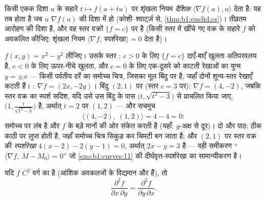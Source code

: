 \begin{remark}[प्रवणता को पढ़ना]
किसी एकक दिशा $u$ के सहारे $t \mapsto f(a + tu)$ पर शृंखला नियम
\emph{दैशिक } $\langle \nabla f(a), u\rangle$ देता है: यह तब 
होता है जब $u$ $\nabla f(a)$ की दिशा में हो (कोशी--श्वार्ट्ज़ से,
\cref{thm:b1:euclid:cs})।  तीव्रतम आरोहण की दिशा है, और वह स्तर
वक्रों $\{f = c\}$ पर  है (किसी स्तर  में खींचे गए वक्र के
सहारे $f$ को अवकलित कीजिए: शृंखला नियम $\langle\nabla f,\,
\text{स्पर्शरेखा}\rangle = 0$ देता है)।
\end{remark}

\begin{example}
\label{ex:b1:multivar:levelcurves}
$f(x, y) = x^2 - y^2$ लीजिए। उसके स्तर : $c > 0$ के लिए $\{f = c\}$
दाएँ-बाएँ खुलता अतिपरवलय है, $c < 0$ के लिए ऊपर-नीचे खुलता, और $c = 0$ के
लिए एक-दूसरे को काटती रेखाओं का युग्म $y = \pm x$ --- किसी पर्वतीय दर्रे का
समोच्च चित्र, जिसका  मूल बिंदु पर है, जहाँ दोनों शून्य-स्तर
रेखाएँ कटती हैं। : $\nabla f = (2x, -2y)$। बिंदु $(2, 1)$ पर (स्तर
$c = 3$ पर): $\nabla f = (4, -2)$, जबकि स्तर वक्र का स्पर्श सदिश, यदि उसे
उस बिंदु के पास $\bigl(t, \sqrt{t^2 - 3}\bigr)$ से प्राचलित किया जाए,
$\bigl(1, \frac{t}{\sqrt{t^2 - 3}}\bigr)$ है, अर्थात् $t = 2$ पर $(1, 2)$
--- और सचमुच
\[
\langle (4, -2),\ (1, 2)\rangle = 4 - 4 = 0 :
\]
 समोच्च पर लंब है और $f$ के बड़े मानों की ओर संकेत करती है (यहाँ:
$y$-अक्ष से दूर)। दो और पाठ:  ठीक काठी पर लुप्त होती है, जहाँ
समोच्च चित्र सिकुड़ कर चिमटी बन जाता है; और $(2,1)$ पर स्तर वक्र की
\emph{स्पर्शरेखा} $4(x - 2) - 2(y - 1) = 0$, अर्थात् $2x - y = 3$ है ---
वही समीकरण ``$\langle \nabla f,\ M - M_0\rangle = 0$'' जो
\cref{exo:b1:curves:11} की दीर्घवृत्त-स्पर्शरेखा का सामान्यीकरण है।
\end{example}

\begin{theorem}[श्वार्ट्ज़]\label{thm:b1:multivar:schwarz}
यदि $f$ $C^2$ वर्ग का है (आंशिक अवकलजों के  विद्यमान और 
हैं), तो
\[
\frac{\partial^2 f}{\partial x\,\partial y}
= \frac{\partial^2 f}{\partial y\,\partial x} .
\]
\end{theorem}
\admitted

